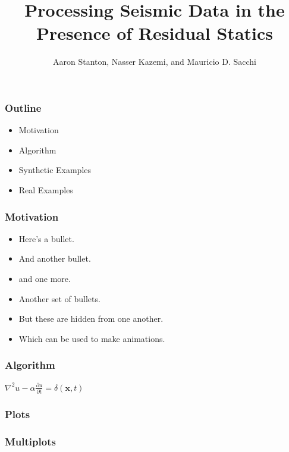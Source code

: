 \title[Short title]{Processing Seismic Data in the Presence of Residual Statics}
\author{Aaron Stanton, Nasser Kazemi, and Mauricio D. Sacchi}
\date{}


\maketitle



\begin{frame} \frametitle{Outline}
    \begin{itemize}
        \item Motivation
        \item Algorithm
        \item Synthetic Examples
        \item Real Examples
    \end{itemize}
\end{frame}

\begin{frame} \frametitle{Motivation}
    \begin{itemize}
        \item Here's a bullet.
        \item And another bullet.
        \item and one more.
    \end{itemize}
    \pause
    \begin{itemize}
        \item Another set of bullets.
            \pause
        \item But these are hidden from one another.
            \pause
        \item Which can be used to make animations.
    \end{itemize}
\end{frame}

\begin{frame} \frametitle{Algorithm}
    \Huge{$\nabla^2 u - \alpha \frac{\partial u}{\partial t} = \delta(\mathbf{x},t)$}
\end{frame}

\begin{frame} \frametitle{Plots}
\end{frame}

\begin{frame} \frametitle{Multiplots}
\end{frame}
